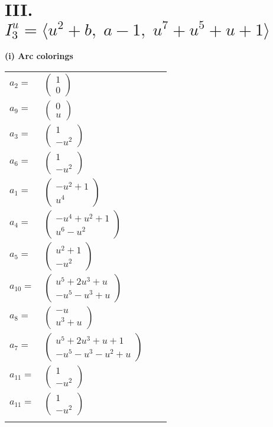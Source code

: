 \documentclass[1p]{elsarticle_modified}
\theoremstyle{definition}
\begin{document}
\centering \section*{III. $I^u_{3}= \langle u^2+b,\;a-1,\;u^7+u^5+u+1 \rangle$}
\flushleft \textbf{(i) Arc colorings}\\
\begin{tabular}{m{7pt} m{180pt} m{7pt} m{180pt} }
\flushright $a_{2}=$&$\begin{pmatrix}1\\0\end{pmatrix}$ \\
\flushright $a_{9}=$&$\begin{pmatrix}0\\u\end{pmatrix}$ \\
\flushright $a_{3}=$&$\begin{pmatrix}1\\- u^2\end{pmatrix}$ \\
\flushright $a_{6}=$&$\begin{pmatrix}1\\- u^2\end{pmatrix}$ \\
\flushright $a_{1}=$&$\begin{pmatrix}- u^2+1\\u^4\end{pmatrix}$ \\
\flushright $a_{4}=$&$\begin{pmatrix}- u^4+u^2+1\\u^6- u^2\end{pmatrix}$ \\
\flushright $a_{5}=$&$\begin{pmatrix}u^2+1\\- u^2\end{pmatrix}$ \\
\flushright $a_{10}=$&$\begin{pmatrix}u^5+2 u^3+u\\- u^5- u^3+u\end{pmatrix}$ \\
\flushright $a_{8}=$&$\begin{pmatrix}- u\\u^3+u\end{pmatrix}$ \\
\flushright $a_{7}=$&$\begin{pmatrix}u^5+2 u^3+u+1\\- u^5- u^3- u^2+u\end{pmatrix}$ \\
\flushright $a_{11}=$&$\begin{pmatrix}1\\- u^2\end{pmatrix}$\\ \flushright $a_{11}=$&$\begin{pmatrix}1\\- u^2\end{pmatrix}$\\&\end{tabular}
\end{document}
